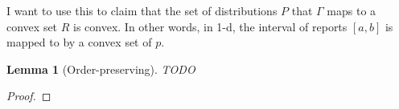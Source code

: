\documentclass[12pt]{article}
\DeclareMathOperator*{\argmin}{arg\,min}
\newtheorem{lemma}{Lemma}
\theoremstyle{definition}
\begin{document}
I want to use this to claim that the set of distributions $P$ that $\Gamma$ maps to a convex set $R$ is convex.
In other words, in 1-d, the interval of reports $[a,b]$ is mapped to by a convex set of $p$.

\begin{lemma}[Order-preserving]
  TODO
\end{lemma}
\begin{proof}
%
\end{proof}
\end{document}
